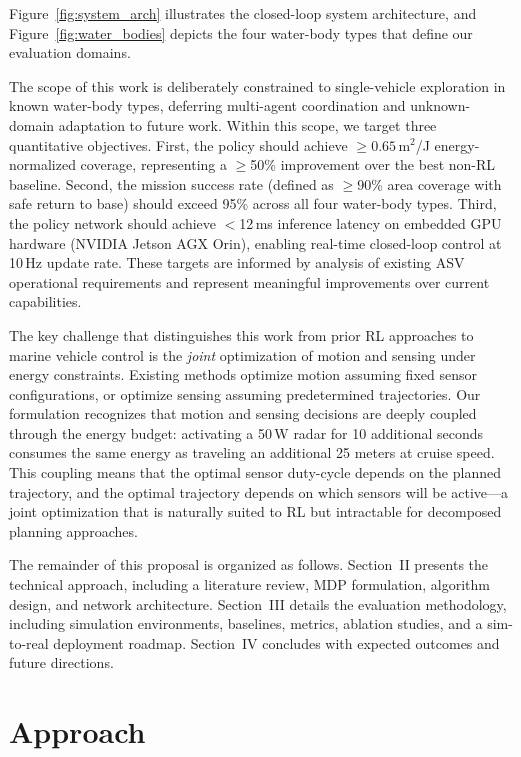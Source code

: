 \documentclass[conference]{IEEEtran}
\begin{document}
Figure~\ref{fig:system_arch} illustrates the closed-loop system architecture, and Figure~\ref{fig:water_bodies} depicts the four water-body types that define our evaluation domains.

The scope of this work is deliberately constrained to single-vehicle exploration in known water-body types, deferring multi-agent coordination and unknown-domain adaptation to future work. Within this scope, we target three quantitative objectives. First, the policy should achieve $\geq 0.65$\,m$^2$/J energy-normalized coverage, representing a $\geq$50\% improvement over the best non-RL baseline. Second, the mission success rate (defined as $\geq$90\% area coverage with safe return to base) should exceed 95\% across all four water-body types. Third, the policy network should achieve $<$12\,ms inference latency on embedded GPU hardware (NVIDIA Jetson AGX Orin), enabling real-time closed-loop control at 10\,Hz update rate. These targets are informed by analysis of existing ASV operational requirements and represent meaningful improvements over current capabilities.

The key challenge that distinguishes this work from prior RL approaches to marine vehicle control is the \textit{joint} optimization of motion and sensing under energy constraints. Existing methods optimize motion assuming fixed sensor configurations, or optimize sensing assuming predetermined trajectories. Our formulation recognizes that motion and sensing decisions are deeply coupled through the energy budget: activating a 50\,W radar for 10 additional seconds consumes the same energy as traveling an additional 25 meters at cruise speed. This coupling means that the optimal sensor duty-cycle depends on the planned trajectory, and the optimal trajectory depends on which sensors will be active---a joint optimization that is naturally suited to RL but intractable for decomposed planning approaches.

The remainder of this proposal is organized as follows. Section~II presents the technical approach, including a literature review, MDP formulation, algorithm design, and network architecture. Section~III details the evaluation methodology, including simulation environments, baselines, metrics, ablation studies, and a sim-to-real deployment roadmap. Section~IV concludes with expected outcomes and future directions.


\section{Approach}
\end{document}

